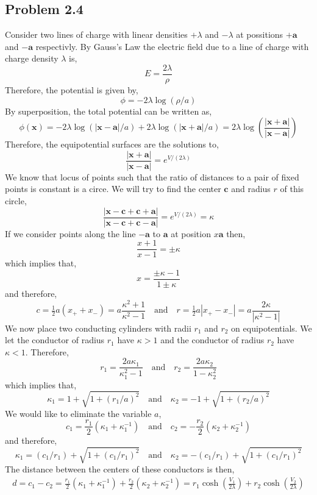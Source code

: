 \documentclass[12pt]{extarticle}
\theoremstyle{definition}
\newcommand{\x}{\mathbf{x}}
\begin{document}
\subsection{Problem 2.4}

\renewcommand{\a}{\mathbf{a}}
\renewcommand{\c}{\mathbf{c}}

Consider two lines of charge with linear densities $+\lambda$ and $-\lambda$ at possitions $+\a$ and $-\a$ respectivly. By Gauss's Law the electric field due to a line of charge with charge density $\lambda$ is,
\[ E = \frac{2 \lambda}{\rho} \]
Therefore, the potential is given by,
\[ \phi = - 2 \lambda \log{(\rho/a)} \]
By superposition, the total potential can be written as,
\[ \phi(\x) = - 2\lambda \log{(|\x - \a|/a)} + 2 \lambda \log{(|\x + \a|/a)} = 2 \lambda \log{\left( \frac{|\x + \a|}{|\x - \a|} \right)} \]
Therefore, the equipotential surfaces are the solutions to,
\[ \frac{|\x + \a|}{|\x - \a|} = e^{V/(2 \lambda)} \]
We know that locus of points such that the ratio of distances to a pair of fixed points is constant is a circe. We will try to find the center $\c$ and radius $r$ of this circle,
\[ \frac{|\x - \c + \c + \a|}{|\x - \c + \c - \a|} = e^{V/(2 \lambda)} = \kappa \]
If we consider points along the line $-\a$ to $\a$ at position $x \a$ then,
\[ \frac{x + 1}{x - 1} = \pm \kappa \]
which implies that,
\[ x = \frac{\pm \kappa - 1}{1 \pm \kappa} \]  
and therefore,
\[ c = \tfrac{1}{2} a \left( x_{+} + x_{-} \right) = a \frac{\kappa^2 + 1}{\kappa^2 - 1} \quad \text{and} \quad r = \tfrac{1}{2} a \left| x_{+} - x_{-} \right| = a \frac{2 \kappa}{| \kappa^2 -  1 |} \]
We now place two conducting cylinders with radii $r_1$ and $r_2$ on equipotentials. We let the conductor of radius $r_1$ have $\kappa > 1$ and the conductor of radius $r_2$ have $\kappa < 1$. Therefore,
\[ r_1 = \frac{2 a \kappa_1}{\kappa_1^2 - 1} \quad \text{and} \quad r_2 = \frac{2 a \kappa_2}{1 - \kappa_2^2} \]
which implies that,
\[ \kappa_1 = 1 + \sqrt{1 + (r_1/a)^2} \quad \text{and} \quad \kappa_2 = -1 + \sqrt{1 + (r_2/a)^2} \]
We would like to eliminate the variable $a$,
\[ c_1 = \frac{r_1}{2} \left( \kappa_1 + \kappa_1^{-1} \right)  \quad \text{and} \quad c_2 = - \frac{r_2}{2} \left( \kappa_2 + \kappa_2^{-1} \right)  \]
and therefore,
\[ \kappa_1 = (c_1 / r_1) + \sqrt{1 + (c_1/r_1)^2} \quad \text{and} \quad \kappa_2 = -(c_1/r_1) + \sqrt{1 + (c_1/r_1)^2} \]
The distance between the centers of these conductors is then,
\begin{align*}
d = c_1 - c_2 = \frac{r_1}{2} \left( \kappa_1 + \kappa_1^{-1} \right) + \frac{r_2}{2} \left( \kappa_2 + \kappa_2^{-1} \right) = r_1 \cosh{\left( \frac{V_1}{2 \lambda} \right)} + r_2 \cosh{\left( \frac{V_2}{2 \lambda} \right)}  
\end{align*} 
\end{document}
